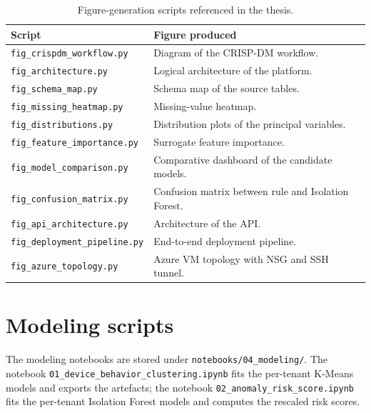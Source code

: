 \begin{table}[h]
\centering
\caption{Figure-generation scripts referenced in the thesis.}
\label{tab:figures}
\begin{tabular}{|l|l|}
\hline
\textbf{Script} & \textbf{Figure produced} \\
\hline
\texttt{fig\_crispdm\_workflow.py} & Diagram of the CRISP-DM workflow. \\
\texttt{fig\_architecture.py} & Logical architecture of the platform. \\
\texttt{fig\_schema\_map.py} & Schema map of the source tables. \\
\texttt{fig\_missing\_heatmap.py} & Missing-value heatmap. \\
\texttt{fig\_distributions.py} & Distribution plots of the principal variables. \\
\texttt{fig\_feature\_importance.py} & Surrogate feature importance. \\
\texttt{fig\_model\_comparison.py} & Comparative dashboard of the candidate models. \\
\texttt{fig\_confusion\_matrix.py} & Confusion matrix between rule and Isolation Forest. \\
\texttt{fig\_api\_architecture.py} & Architecture of the API. \\
\texttt{fig\_deployment\_pipeline.py} & End-to-end deployment pipeline. \\
\texttt{fig\_azure\_topology.py} & Azure VM topology with NSG and SSH tunnel. \\
\hline
\end{tabular}
\end{table}

\section{Modeling scripts}
The modeling notebooks are stored under \texttt{notebooks/04\_modeling/}. The notebook \texttt{01\_device\_behavior\_clustering.ipynb} fits the per-tenant K-Means models and exports the artefacts; the notebook \texttt{02\_anomaly\_risk\_score.ipynb} fits the per-tenant Isolation Forest models and computes the rescaled risk scores.

\cleardoublepage

